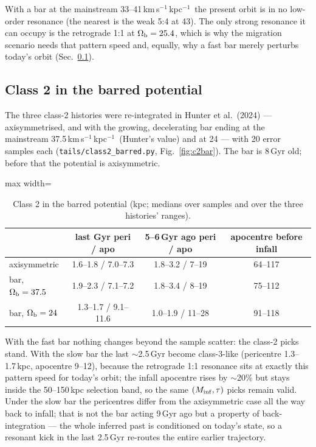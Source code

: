 \documentclass[11pt,a4paper]{article}
\newcommand{\kmskpc}{km\,s$^{-1}$\,kpc$^{-1}$}
\newcommand{\Ob}{\Omega_{\rm b}}
\begin{document}
With a bar at the mainstream 33--41\,\kmskpc\ the present orbit is in no low-order
resonance (the nearest is the weak 5:4 at 43). The only strong resonance it can occupy is the
retrograde 1:1 at $\Ob=25.4$, which is why the migration scenario needs that pattern speed and,
equally, why a fast bar merely perturbs today's orbit (Sec.~\ref{sec:c2bar}).

\subsection{Class 2 in the barred potential}
\label{sec:c2bar}
The three class-2 histories were re-integrated in Hunter et al.\ (2024) --- axisymmetrised,
and with the growing, decelerating bar ending at the mainstream 37.5\,\kmskpc\ (Hunter's
value) and at 24 --- with 20 error samples each (\texttt{tails/class2\_barred.py},
Fig.~\ref{fig:c2bar}). The bar is 8\,Gyr old; before that the potential is axisymmetric.

\begin{table}[h]\centering
\caption{Class 2 in the barred potential (kpc; medians over samples and over the three
histories' ranges).}
\begin{adjustbox}{max width=\linewidth}
\begin{tabular}{lccc}\toprule
& last Gyr peri / apo & 5--6\,Gyr ago peri / apo & apocentre before infall\\\midrule
axisymmetric & 1.6--1.8 / 7.0--7.3 & 1.8--3.2 / 7--19 & 64--117\\
bar, $\Ob=37.5$ & 1.9--2.3 / 7.1--7.2 & 1.8--3.4 / 8--19 & 75--112\\
bar, $\Ob=24$ & 1.3--1.7 / 9.1--11.6 & 1.0--1.9 / 11--28 & 91--118\\
\bottomrule\end{tabular}
\end{adjustbox}
\end{table}

With the fast bar nothing changes beyond the sample scatter: the class-2 picks stand. With
the slow bar the last $\sim$2.5\,Gyr become class-3-like (pericentre 1.3--1.7\,kpc,
apocentre 9--12), because the retrograde 1:1 resonance sits at exactly this pattern speed for today's
orbit; the infall apocentre rises by $\sim$20\% but stays inside the 50--150\,kpc selection
band, so the same $(M_{\rm inf},\tau)$ picks remain valid. Under the slow bar the pericentres
differ from the axisymmetric case all the way back to infall; that is not the bar acting
9\,Gyr ago but a property of back-integration --- the whole inferred past is conditioned on
today's state, so a resonant kick in the last 2.5\,Gyr re-routes the entire earlier
trajectory.
\end{document}
